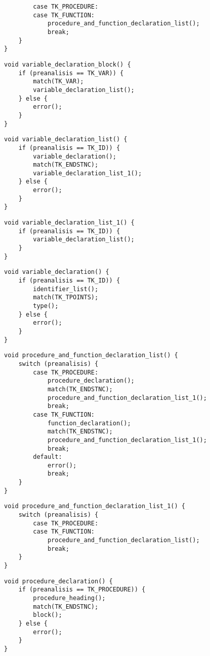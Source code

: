 \begin{multicols}{2}
\begin{verbatim}
		case TK_PROCEDURE:
		case TK_FUNCTION:
			procedure_and_function_declaration_list();
			break;
	}
}
\end{verbatim}
\begin{verbatim}
void variable_declaration_block() {
	if (preanalisis == TK_VAR)) {
		match(TK_VAR);
		variable_declaration_list();
	} else {
		error();
	}
}
\end{verbatim}
\begin{verbatim}
void variable_declaration_list() {
	if (preanalisis == TK_ID)) {
		variable_declaration();
		match(TK_ENDSTNC);
		variable_declaration_list_1();
	} else {
		error();
	}
}
\end{verbatim}
\begin{verbatim}
void variable_declaration_list_1() {
	if (preanalisis == TK_ID)) {
		variable_declaration_list();
	}
}
\end{verbatim}
\begin{verbatim}
void variable_declaration() {
	if (preanalisis == TK_ID)) {
		identifier_list();
		match(TK_TPOINTS);
		type();
	} else {
		error();
	}
}
\end{verbatim}
\begin{verbatim}
void procedure_and_function_declaration_list() {
	switch (preanalisis) {
		case TK_PROCEDURE:
			procedure_declaration();
			match(TK_ENDSTNC);
			procedure_and_function_declaration_list_1();
			break;
		case TK_FUNCTION:
			function_declaration();
			match(TK_ENDSTNC);
			procedure_and_function_declaration_list_1();
			break;
		default:
			error();
			break;
	}
}
\end{verbatim}
\begin{verbatim}
void procedure_and_function_declaration_list_1() {
	switch (preanalisis) {
		case TK_PROCEDURE:
		case TK_FUNCTION:
			procedure_and_function_declaration_list();
			break;
	}
}
\end{verbatim}
\begin{verbatim}
void procedure_declaration() {
	if (preanalisis == TK_PROCEDURE)) {
		procedure_heading();
		match(TK_ENDSTNC);
		block();
	} else {
		error();
	}
}
\end{verbatim}
\begin{verbatim}

\end{verbatim}
\end{multicols}
